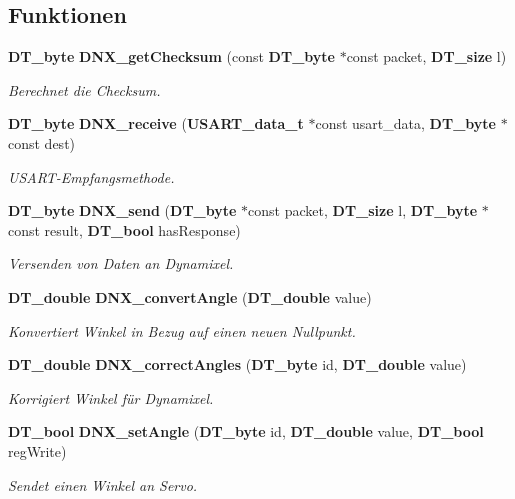 \subsection*{Funktionen}
\begin{DoxyCompactItemize}
\item 
{\bf DT\_\-byte} {\bf DNX\_\-getChecksum} (const {\bf DT\_\-byte} $\ast$const packet, {\bf DT\_\-size} l)
\begin{DoxyCompactList}\small\item\em Berechnet die Checksum. \item\end{DoxyCompactList}\item 
{\bf DT\_\-byte} {\bf DNX\_\-receive} ({\bf USART\_\-data\_\-t} $\ast$const usart\_\-data, {\bf DT\_\-byte} $\ast$const dest)
\begin{DoxyCompactList}\small\item\em USART-\/Empfangsmethode. \item\end{DoxyCompactList}\item 
{\bf DT\_\-byte} {\bf DNX\_\-send} ({\bf DT\_\-byte} $\ast$const packet, {\bf DT\_\-size} l, {\bf DT\_\-byte} $\ast$const result, {\bf DT\_\-bool} hasResponse)
\begin{DoxyCompactList}\small\item\em Versenden von Daten an Dynamixel. \item\end{DoxyCompactList}\item 
{\bf DT\_\-double} {\bf DNX\_\-convertAngle} ({\bf DT\_\-double} value)
\begin{DoxyCompactList}\small\item\em Konvertiert Winkel in Bezug auf einen neuen Nullpunkt. \item\end{DoxyCompactList}\item 
{\bf DT\_\-double} {\bf DNX\_\-correctAngles} ({\bf DT\_\-byte} id, {\bf DT\_\-double} value)
\begin{DoxyCompactList}\small\item\em Korrigiert Winkel für Dynamixel. \item\end{DoxyCompactList}\item 
{\bf DT\_\-bool} {\bf DNX\_\-setAngle} ({\bf DT\_\-byte} id, {\bf DT\_\-double} value, {\bf DT\_\-bool} regWrite)
\begin{DoxyCompactList}\small\item\em Sendet einen Winkel an Servo. \item\end{DoxyCompactList}\item 

\end{DoxyCompactItemize}
